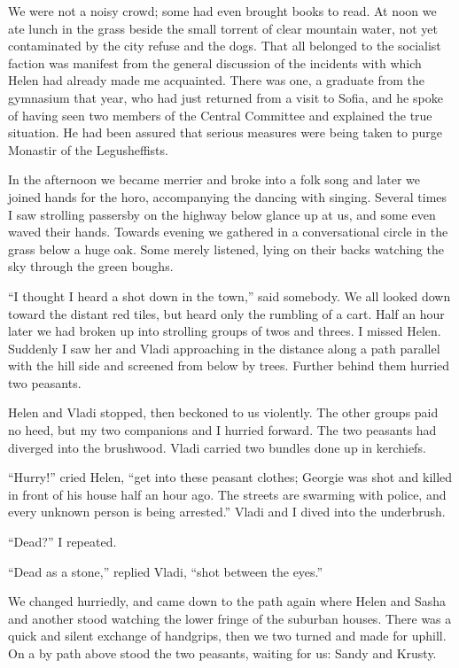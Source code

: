 \documentclass[a5paper,12pt]{book}
\begin{document}
We were not a noisy crowd; some had even brought books to read. At noon we ate lunch in the grass beside the small torrent of clear mountain water, not yet contaminated by the city refuse and the dogs. That all belonged to the socialist faction was manifest from the general discussion of the incidents with which Helen had already made me acquainted. There was one, a graduate from the gymnasium that year, who had just returned from a visit to Sofia, and he spoke of having seen two members of the Central Committee and explained the true situation. He had been assured that serious measures were being taken to purge Monastir of the Legusheffists.

In the afternoon we became merrier and broke into a folk song and later we joined hands for the horo, accompanying the dancing with singing. Several times I saw strolling passersby on the highway below glance up at us, and some even waved their hands. Towards evening we gathered in a conversational circle in the grass below a huge oak. Some merely listened, lying on their backs watching the sky through the green boughs.

“I thought I heard a shot down in the town,” said somebody. We all looked down toward the distant red tiles, but heard only the rumbling of a cart. Half an hour later we had broken up into strolling groups of twos and threes. I missed Helen. Suddenly I saw her and Vladi approaching in the distance along a path parallel with the hill side and screened from below by trees. Further behind them hurried two peasants.

Helen and Vladi stopped, then beckoned to us violently. The other groups paid no heed, but my two companions and I hurried forward. The two peasants had diverged into the brushwood. Vladi carried two bundles done up in kerchiefs.

“Hurry!” cried Helen, “get into these peasant clothes; Georgie was shot and killed in front of his house half an hour ago. The streets are swarming with police, and every unknown person is being arrested.” Vladi and I dived into the underbrush.

“Dead?” I repeated.

“Dead as a stone,” replied Vladi, “shot between the eyes.”

We changed hurriedly, and came down to the path again where Helen and Sasha and another stood watching the lower fringe of the suburban houses. There was a quick and silent exchange of handgrips, then we two turned and made for uphill. On a by path above stood the two peasants, waiting for us: Sandy and Krusty.
\end{document}
